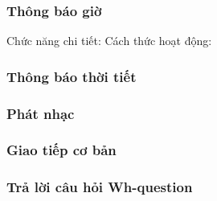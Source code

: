\subsubsection{Thông báo giờ}
Chức năng chi tiết:
Cách thức hoạt động:
\subsubsection{Thông báo thời tiết}
\subsubsection{Phát nhạc}
\subsubsection{Giao tiếp cơ bản}
\subsubsection{Trả lời câu hỏi Wh-question}